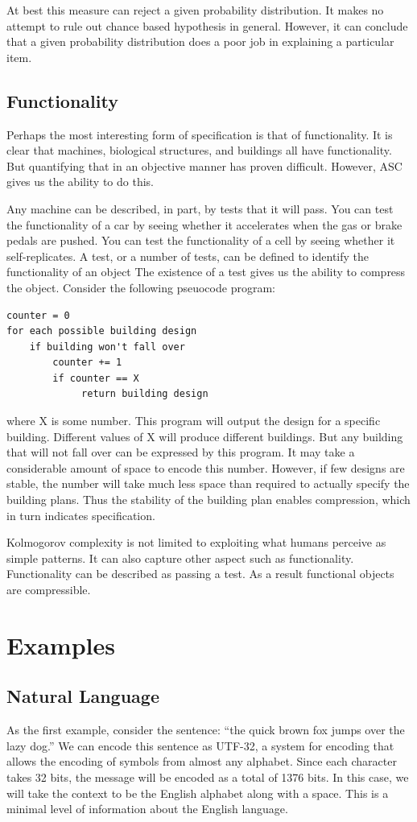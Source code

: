 At best this measure can reject a given probability distribution.
It makes no attempt to rule out chance based hypothesis in general.
However, it can conclude that a given probability distribution does a poor job in explaining a particular item.

\subsection{Functionality}

Perhaps the most interesting form of specification is that of functionality.
It is clear that machines, biological structures, and buildings all have functionality.
But quantifying that in an objective manner has proven difficult.
However, ASC gives us the ability to do this.

Any machine can be described, in part, by tests that it will pass.
You can test the functionality of a car by seeing whether it accelerates when the gas or brake pedals are pushed.
You can test the functionality of a cell by seeing whether it self-replicates.
A test, or a number of tests, can be defined to identify the functionality of an object 
The existence of a test gives us the ability to compress the object.
Consider the following pseuocode program:
\begin{verbatim}
counter = 0
for each possible building design
    if building won't fall over
        counter += 1
        if counter == X
             return building design
\end{verbatim} where X is some number.
This program will output the design for a specific building.
Different values of X will produce different buildings.
But any building that will not fall over can be expressed by this program.
It may take a considerable amount of space to encode this number.
However, if few designs are stable, the number will take much less space than required to actually specify the building plans.
Thus the stability of the building plan enables compression, which in turn indicates specification.

Kolmogorov complexity is not limited to exploiting what humans perceive as simple patterns.
It can also capture other aspect such as functionality.
Functionality can be described as passing a test.
As a result functional objects are compressible.

\section{Examples}
\subsection{Natural Language}
As the first example, consider the sentence: ``the quick brown fox jumps over the lazy dog.''
We can encode this sentence as UTF-32, a system for encoding that allows the encoding of symbols from almost any alphabet.
Since each character takes 32 bits, the message will be encoded as a total of 1376 bits.
In this case, we will take the context to be the English alphabet along with a space.
This is a minimal level of information about the English language.

